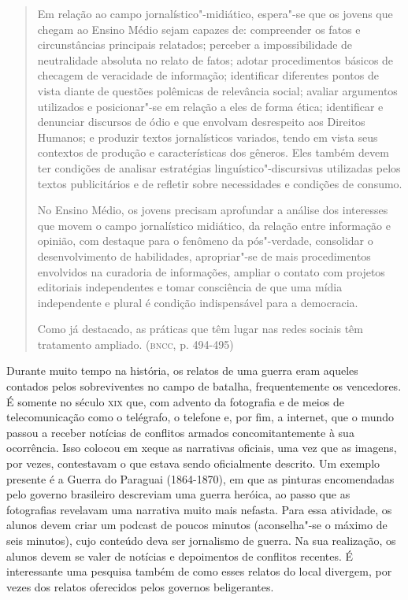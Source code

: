 \documentclass[12pt]{extarticle}
\begin{document}
\begin{quote}
Em relação ao campo jornalístico"-midiático, espera"-se que os jovens
que chegam ao Ensino Médio sejam capazes de: compreender os fatos e
circunstâncias principais relatados; perceber a impossibilidade de
neutralidade absoluta no relato de fatos; adotar procedimentos básicos
de checagem de veracidade de informação; identificar diferentes pontos
de vista diante de questões polêmicas de relevância social; avaliar
argumentos utilizados e posicionar"-se em relação a eles de forma ética;
identificar e denunciar discursos de ódio e que envolvam desrespeito aos
Direitos Humanos; e produzir textos jornalísticos variados, tendo em
vista seus contextos de produção e características dos gêneros. Eles
também devem ter condições de analisar estratégias
linguístico"-discursivas utilizadas pelos textos publicitários e de
refletir sobre necessidades e condições de consumo.

No Ensino Médio, os jovens precisam aprofundar a análise dos interesses
que movem o campo jornalístico midiático, da relação entre informação e
opinião, com destaque para o fenômeno da pós"-verdade, consolidar o
desenvolvimento de habilidades, apropriar"-se de mais procedimentos
envolvidos na curadoria de informações, ampliar o contato com projetos
editoriais independentes e tomar consciência de que uma mídia
independente e plural é condição indispensável para a democracia.

Como já destacado, as práticas que têm lugar nas redes sociais têm
tratamento ampliado. (\textsc{bncc}, p. 494-495)
\end{quote}

Durante muito tempo na história, os relatos de uma guerra eram aqueles
contados pelos sobreviventes no campo de batalha, frequentemente os
vencedores. É somente no século \textsc{xix} que, com advento da fotografia e
de meios de telecomunicação como o telégrafo, o telefone e, por fim, a
internet, que o mundo passou a receber notícias de conflitos armados
concomitantemente à sua ocorrência. Isso colocou em xeque as
narrativas oficiais, uma vez que as imagens, por vezes, contestavam o
que estava sendo oficialmente descrito. Um exemplo presente é a Guerra
do Paraguai (1864-1870), em que as pinturas encomendadas pelo governo
brasileiro descreviam uma guerra heróica, ao passo que as fotografias
revelavam uma narrativa muito mais nefasta. Para essa atividade, os
alunos devem criar um podcast de poucos minutos (aconselha"-se o máximo
de seis minutos), cujo conteúdo deva ser jornalismo de guerra. Na sua
realização, os alunos devem se valer de notícias e depoimentos de
conflitos recentes. É interessante uma pesquisa também de como esses
relatos do local divergem, por vezes dos relatos oferecidos pelos
governos beligerantes.
\end{document}

